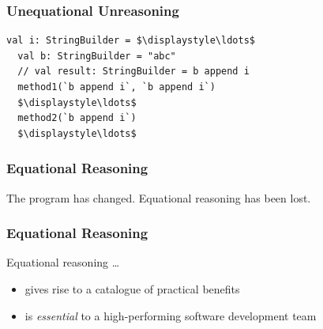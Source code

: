 \begin{frame}[fragile]
\frametitle{Unequational Unreasoning}
\begin{lstlisting}[style=scala,mathescape]
  val i: StringBuilder = $\displaystyle\ldots$
  val b: StringBuilder = "abc"
  // val result: StringBuilder = b append i
  method1(`b append i`, `b append i`)
  $\displaystyle\ldots$
  method2(`b append i`)
  $\displaystyle\ldots$
\end{lstlisting}
\end{frame}


\begin{frame}
\frametitle{Equational Reasoning}
\begin{center}
The program has changed. Equational reasoning has been lost.
\end{center}
\end{frame}


\begin{frame}
\frametitle{Equational Reasoning}
\begin{block}{Equational reasoning \ldots}
\begin{itemize}
  \item gives rise to a catalogue of practical benefits
  \item is \emph{essential} to a high-performing software development team
\end{itemize}
\end{block}
\end{frame}
